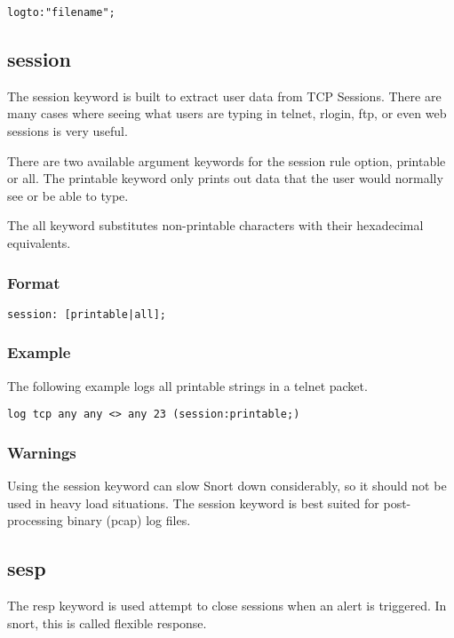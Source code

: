 \documentclass[english]{report}
\begin{document}
\begin{verbatim}
logto:"filename";
\end{verbatim}

\subsection{session}

The session keyword is built to extract user data from TCP Sessions.  There are
many cases where seeing what users are typing in telnet, rlogin, ftp, or even
web sessions is very useful. 

There are two available argument keywords for the session rule option,
printable or all. The printable keyword only prints out data that the user
would normally see or be able to type. 

The all keyword substitutes non-printable characters with their hexadecimal
equivalents. 

\subsubsection{Format}

\begin{verbatim}
session: [printable|all];
\end{verbatim}

\subsubsection{Example}
The following example logs all printable strings in a telnet packet.
\begin{verbatim}
log tcp any any <> any 23 (session:printable;)
\end{verbatim}

\subsubsection{Warnings}
Using the session keyword can slow Snort down considerably, so it should not be
used in heavy load situations. The session keyword is best suited for
post-processing binary (pcap) log files. 

\subsection{sesp}

The resp keyword is used attempt to close sessions when an alert is triggered.  In snort, this is called flexible response.
\end{document}
